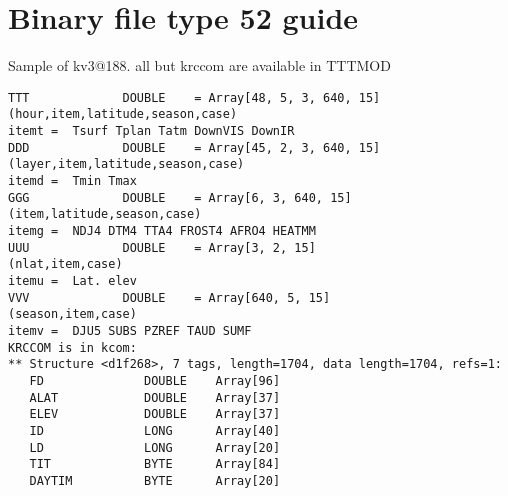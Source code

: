 \documentclass{article}
\begin{document}
\section{Binary file type 52 guide}
Sample of kv3@188. all but krccom are available in TTTMOD
\vspace{-3.mm} 
\begin{verbatim}
TTT             DOUBLE    = Array[48, 5, 3, 640, 15] 
(hour,item,latitude,season,case)
itemt =  Tsurf Tplan Tatm DownVIS DownIR
DDD             DOUBLE    = Array[45, 2, 3, 640, 15]
(layer,item,latitude,season,case)
itemd =  Tmin Tmax
GGG             DOUBLE    = Array[6, 3, 640, 15]
(item,latitude,season,case)
itemg =  NDJ4 DTM4 TTA4 FROST4 AFRO4 HEATMM
UUU             DOUBLE    = Array[3, 2, 15]
(nlat,item,case)
itemu =  Lat. elev
VVV             DOUBLE    = Array[640, 5, 15]
(season,item,case)
itemv =  DJU5 SUBS PZREF TAUD SUMF
KRCCOM is in kcom:
** Structure <d1f268>, 7 tags, length=1704, data length=1704, refs=1:
   FD              DOUBLE    Array[96]
   ALAT            DOUBLE    Array[37]
   ELEV            DOUBLE    Array[37]
   ID              LONG      Array[40]
   LD              LONG      Array[20]
   TIT             BYTE      Array[84]
   DAYTIM          BYTE      Array[20]
\end{verbatim} 
\end{document}
